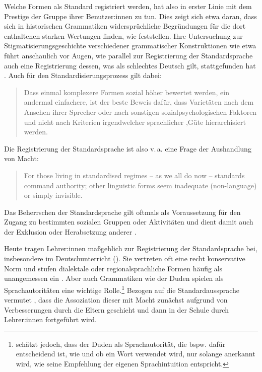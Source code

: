 Welche Formen als Standard registriert werden, hat also in erster Linie mit dem Prestige der Gruppe ihrer Benutzer:innen zu tun. 
Dies zeigt sich etwa daran, dass sich in historischen Grammatiken widersprüchliche Begründungen für die dort enthaltenen starken Wertungen finden, wie \citet[157]{Davies.2006} feststellen. 
Ihre Untersuchung zur Stigmatisierungsgeschichte verschiedener grammatischer Konstruktionen wie etwa  führt anschaulich vor Augen, wie parallel zur Registrierung der Standardsprache auch eine Registrierung dessen, was als \glqq schlechtes Deutsch\grqq{} gilt, stattgefunden hat \citep[s.][]{Davies.2006}.
Auch für den Standardisierungsprozess gilt dabei: 
\begin{quote}Dass einmal komplexere Formen sozial h{\"o}her bewertet werden, ein andermal einfachere, ist der beste Beweis daf{\"u}r, dass Variet{\"a}ten nach dem Ansehen ihrer Sprecher oder nach sonstigen sozialpsychologischen Faktoren und nicht nach Kriterien irgendwelcher sprachlicher ,G{\"u}te{\grq} hierarchisiert werden.~\citep[527]{Harnisch.2005}\end{quote}
Die Registrierung der Standardsprache ist also v.\,a. eine Frage der Aushandlung von Macht: 
\begin{quote}For those living in standardised regimes -- as we all do now -- standards command authority; other linguistic forms seem inadequate (non-language) or simply invisible. \citep[164]{Gal.2016}\end{quote} 
Das Beherrschen der Standardsprache gilt oftmals als Voraussetzung für den Zugang zu bestimmten sozialen Gruppen oder Aktivitäten und dient damit auch der Exklusion oder Herabsetzung anderer \citep[s.][12]{Cameron1995}. 

Heute tragen Lehrer:innen maßgeblich zur Registrierung der Standardsprache bei, insbesondere im Deutschunterricht (\cites[s.][133]{Davies.2000}[328]{Langer.}). 
Sie vertreten oft eine recht konservative Norm und stufen dialektale oder regionalsprachliche Formen häufig als unangemessen ein \citep[s.][129--130]{Davies.2000}. 
Aber auch Grammatiken wie der Duden spielen als Sprachautoritäten eine wichtige Rolle.\footnote{\citet[328]{Langer.} sch{\"a}tzt jedoch, dass der Duden als Sprachautorit{\"a}t, die bspw. daf{\"u}r entscheidend ist, wie und ob ein Wort verwendet wird, nur solange anerkannt wird, wie seine Empfehlung der eigenen Sprachintuition entspricht.}
Bezogen auf die Standardaussprache vermutet \citet[16]{Eckert.2011}, dass die Assoziation dieser mit Macht zunächst aufgrund von Verbesserungen durch die Eltern geschieht und dann in der Schule durch Lehrer:innen fortgeführt wird. %

